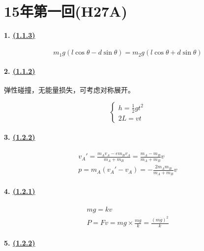
\section{15年第一回(H27A)}

\paragraph{1. \hyperref[subsec:1.1.3]{(1.1.3)}}

\begin{equation*}
    m_1g(l\cos\theta-d\sin\theta)=m_2g(l\cos\theta+d\sin\theta)
\end{equation*}

\paragraph{2. \hyperref[subsec:1.1.2]{(1.1.2)}} 弹性碰撞，无能量损失，可考虑对称展开。

\begin{equation*}
    \begin{cases}
        h=\frac12gt^2\\
        2L=vt
    \end{cases}
\end{equation*}

\paragraph{3. \hyperref[subsec:1.2.2]{(1.2.2)}}

\begin{gather*}
    v_A'=\frac{m_Av_A-em_Bv_A}{m_A+m_B}=\frac{m_A-m_B}{m_A+m_B}v\\
    p=m_A(v_A'-v_A)=-\frac{2m_Am_B}{m_A+m_B}v
\end{gather*}

\paragraph{4. \hyperref[subsec:1.2.1]{(1.2.1)}}

\begin{gather*}
    mg=kv\\
    P=Fv=mg\times\frac{mg}{k}=\frac{(mg)^2}{k}
\end{gather*}

\paragraph{5. \hyperref[subsec:1.2.2]{(1.2.2)}}


